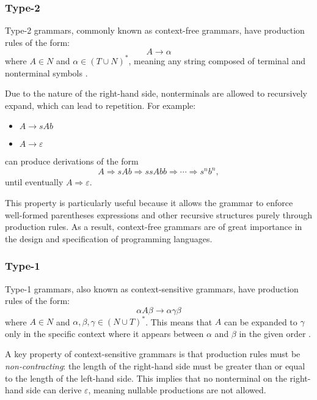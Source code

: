 \subsubsection{Type-2}

Type-2 grammars, commonly known as context-free grammars, have production rules of the form:
\[
A \rightarrow \alpha
\]
where \( A \in N \) and \( \alpha \in (T \cup N)^* \), meaning any string composed of terminal and nonterminal symbols \cite{hendriksConsiderItParsed,shiIntelligenceScience2021}.

Due to the nature of the right-hand side, nonterminals are allowed to recursively expand, which can lead to repetition. For example:
\begin{itemize}
    \item[] \( A \rightarrow sAb \)
    \item[] \( A \rightarrow \varepsilon \)
\end{itemize}
can produce derivations of the form
\[
A \Rightarrow sAb \Rightarrow ssAbb \Rightarrow \cdots \Rightarrow s^n b^n,
\]
until eventually \( A \Rightarrow \varepsilon \).

This property is particularly useful because it allows the grammar to enforce well-formed parentheses expressions and other recursive structures purely through production rules. As a result, context-free grammars are of great importance in the design and specification of programming languages\cite{hendriksConsiderItParsed,shiIntelligenceScience2021}.

\subsubsection{Type-1}

Type-1 grammars, also known as context-sensitive grammars, have production rules of the form:
\[
\alpha A \beta \rightarrow \alpha \gamma \beta
\]
where \( A \in N \) and \( \alpha, \beta, \gamma \in (N \cup T)^* \). This means that \( A \) can be expanded to \( \gamma \) only in the specific context where it appears between \( \alpha \) and \( \beta \) in the given order \cite{hendriksConsiderItParsed,shiIntelligenceScience2021}.

\vspace{\baselineskip}
A key property of context-sensitive grammars is that production rules must be \emph{non-contracting}: the length of the right-hand side must be greater than or equal to the length of the left-hand side. This implies that no nonterminal on the right-hand side can derive \( \varepsilon \), meaning nullable productions are not allowed.

